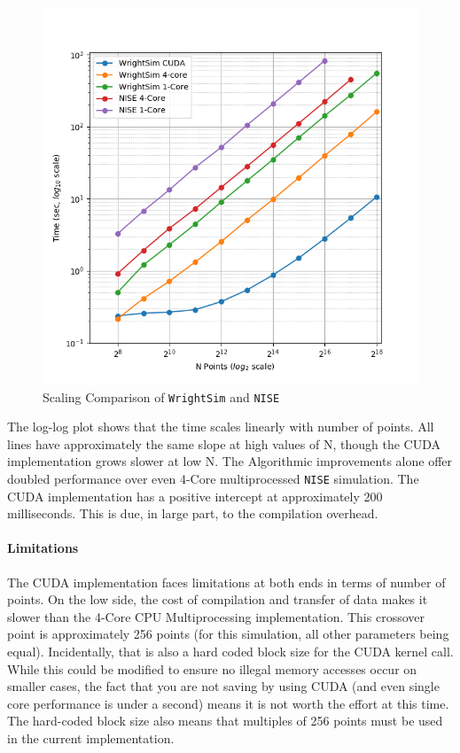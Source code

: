 \begin{figure}
\centering
\includegraphics{simulation/images/Scaling.png}
\caption{Scaling Comparison of \texttt{WrightSim} and \texttt{NISE}
\label{sim:fig:scaling}}
\end{figure}

The log-log plot shows that the time scales linearly with number of
points. All lines have approximately the same slope at high values of N,
though the CUDA implementation grows slower at low N. The Algorithmic
improvements alone offer doubled performance over even 4-Core
multiprocessed \texttt{NISE} simulation. The CUDA implementation has a
positive intercept at approximately 200 milliseconds. This is due, in
large part, to the compilation overhead.

\hypertarget{limitations}{%
\paragraph{Limitations}\label{limitations}}

The CUDA implementation faces limitations at both ends in terms of
number of points. On the low side, the cost of compilation and transfer
of data makes it slower than the 4-Core CPU Multiprocessing
implementation. This crossover point is approximately 256 points (for
this simulation, all other parameters being equal). Incidentally, that
is also a hard coded block size for the CUDA kernel call. While this
could be modified to ensure no illegal memory accesses occur on smaller
cases, the fact that you are not saving by using CUDA (and even single
core performance is under a second) means it is not worth the effort at
this time. The hard-coded block size also means that multiples of 256
points must be used in the current implementation.

